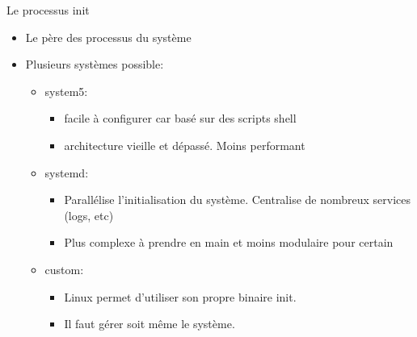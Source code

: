 \begin{frame}{Le processus init}
  \begin{itemize}
  \item Le père des processus du système
  \item Plusieurs systèmes possible:
    \begin{itemize}
    \item system5:
      \begin{itemize}
      \item facile à configurer car basé sur des scripts shell
      \item architecture vieille et dépassé. Moins performant
      \end{itemize}
    \item systemd:
      \begin{itemize}
      \item Parallélise l'initialisation du système. Centralise de nombreux services (logs, etc)
      \item Plus complexe à prendre en main et moins modulaire pour certain
      \end{itemize}
    \item custom:
      \begin{itemize}
      \item Linux permet d'utiliser son propre binaire init.
      \item Il faut gérer soit même le système.
      \end{itemize}
    \end{itemize}
  \end{itemize}
\end{frame}
